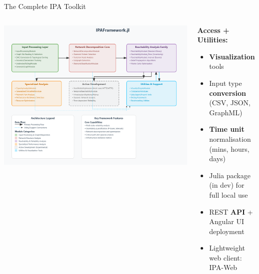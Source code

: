 \documentclass[aspectratio=169]{beamer}
\begin{document}
\begin{frame}{The Complete IPA Toolkit}
\begin{columns}
  \begin{column}{0.72\textwidth}
    \begin{center}
      \includegraphics[height=0.83\textheight]{ipa_bigpicture.png}
    \end{center}
  \end{column}

  \begin{column}{0.26\textwidth}
    \footnotesize
    \textbf{Access + Utilities:}
    \begin{itemize}
      \item \textbf{Visualization} tools 
      \item Input type \textbf{conversion} (CSV, JSON, GraphML)
      \item \textbf{Time unit} normalisation (mins, hours, days)
      \item Julia package (in dev) for full local use
      \item REST \textbf{API} + Angular UI deployment
      \item Lightweight web client: IPA-Web
    \end{itemize}

  \end{column}
\end{columns}
\end{frame}
\end{document}
